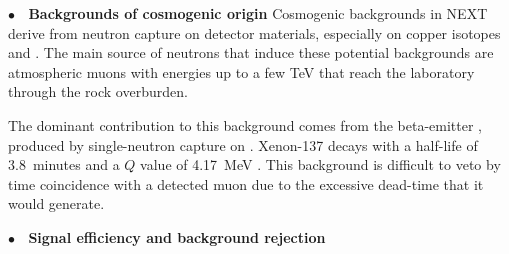 {\bf $\bullet$~ Backgrounds of cosmogenic origin}
\label{sec:muons}
Cosmogenic backgrounds in NEXT derive from neutron capture on detector materials, especially on copper isotopes and . The main source of neutrons that induce these potential backgrounds are atmospheric muons with energies up to a few TeV that reach the laboratory through the rock overburden. 

\indent

The dominant contribution to this background comes from the beta-emitter , produced by single-neutron capture on . Xenon-137 decays with a half-life of \SI{3.8}{minutes} and a $Q$ value of \SI{4.17}{\mega\eV} \cite{nudat}. This background is difficult to veto by time coincidence with a detected muon due to the excessive dead-time that it would generate. 


\indent

{\bf $\bullet$~ Signal efficiency and background rejection}
\label{sec:SimulationAndAnalysis}

\indent


